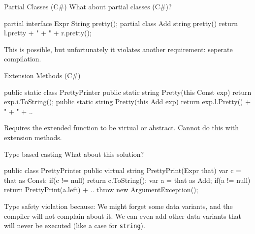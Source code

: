 \documentclass[10pt, compress]{beamer}
\newcommand{\inlinecode}[2]{\colorbox{backg}{\scriptsize{\texttt{#2}}}}
\newenvironment{slide}[1]{\begin{frame}[fragile,environment=slide]{#1}}{\end{frame}}
\newenvironment{slide}[2]{\begin{frame}[fragile,environment=slide]{#1}{#2}}{\end{frame}}
\begin{document}
\begin{slide}{Partial Classes (C\#)}
What about partial classes (C\#)?
\begin{csharp}
partial interface Expr { String pretty(); }
partial class Add {
  string pretty() {
    return l.pretty + " + " + r.pretty();
  }
}
\end{csharp}
This is possible, but unfortunately it violates another requirement: seperate compilation.
\end{slide}


\begin{slide}{Extension Methods (C\#)}
\begin{csharp}
public static class PrettyPrinter {
  public static string Pretty(this Const exp)
  {
    return exp.i.ToString();
  }
  public static string Pretty(this Add exp)
  {
    return exp.l.Pretty() + " + " + ..
  }
}
\end{csharp}
Requires the extended function to be virtual or abstract. Cannot do this with extension methods.
\end{slide}


\begin{slide}{Type based casting}
What about this solution?
\begin{csharp}
public class PrettyPrinter {
  public virtual string PrettyPrint(Expr that)
  {
      var c = that as Const;
      if(c != null) return c.ToString();
      var a = that as Add;
      if(a != null) return PrettyPrint(a.left) + ..
      throw new ArgumentException();
  }
}
\end{csharp}
Type safety violation
because:
  We might forget some data variants, and the compiler will not complain about it.
  We can even add other data variants that will never be executed (like a case for \inlinecode{csharp}{string}).
\end{slide}
\end{document}
